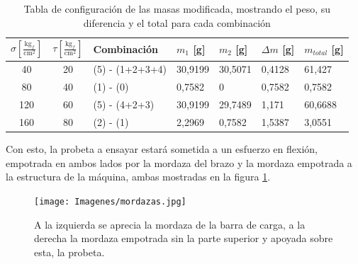 \begin{table}[h]
\centering
\begin{tabular}{@{}cclllll@{}}
\toprule
$\sigma \left[\frac{\text{kg}_f}{\text{cm}^2}\right]$ & {$\tau \left[\frac{\text{kg}_f}{\text{cm}^2}\right]$} & Combinación     & $m_1$ {[}g{]} & $m_2$ {[}g{]} & $\Delta m$ {[}g{]} & $m_{total}$ {[}g{]} \\ \midrule
40                                                   & 20                                                                    & (5) - (1+2+3+4) & 30,9199       & 30,5071       & 0,4128             & 61,427              \\
80                                                   & 40                                                                    & (1) - (0)       & 0,7582        & 0             & 0,7582             & 0,7582              \\
120                                                  & 60                                                                    & (5) - (4+2+3)   & 30,9199       & 29,7489       & 1,171              & 60,6688             \\
160                                                  & 80                                                                    & (2) - (1)       & 2,2969        & 0,7582        & 1,5387             & 3,0551              \\ \bottomrule
\end{tabular}
\caption{Tabla de configuración de las masas modificada, mostrando el peso, su diferencia y el total para cada combinación}
\label{tab:ejemplo_config}
\end{table}

Con esto, la probeta a ensayar estará sometida a un esfuerzo en flexión, empotrada en ambos lados por la mordaza del brazo y la mordaza empotrada a la estructura de la máquina, ambas mostradas en la figura \ref{fig:mordazas}.

\begin{figure}[h]
\centering
\texttt{[image: Imagenes/mordazas.jpg]}
\caption{A la izquierda se aprecia la mordaza de la barra de carga, a la derecha la mordaza empotrada sin la parte superior y apoyada sobre esta, la probeta.}
\label{fig:mordazas}
\end{figure}

